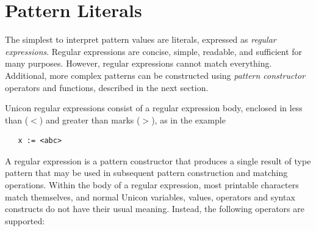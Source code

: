 \documentclass[letterpaper,12pt]{article}
\begin{document}
\section{Pattern Literals}

The simplest to interpret pattern values are literals, expressed as
{\em regular expressions\/}. Regular expressions are concise, simple,
readable, and sufficient for many purposes.
However, regular expressions cannot match
everything. Additional, more complex patterns can be constructed using
{\em pattern constructor\/} operators and functions, described in the
next section.

Unicon regular expressions consist of a regular expression body,
enclosed in less than ({\tt $<$}) and greater than marks ({\tt $>$}),
as in the example

\begin{verbatim}
   x := <abc>
\end{verbatim}

A regular expression is a pattern constructor that produces a single
result of type pattern that may be used in subsequent pattern
construction and matching operations.  Within the body of a regular
expression, most printable characters match themselves, and normal
Unicon variables, values, operators and syntax constructs do not have
their usual meaning. Instead, the following operators are supported:
\end{document}
